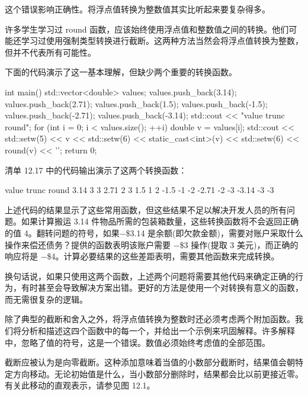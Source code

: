 这个错误影响正确性。将浮点值转换为整数值其实比听起来要复杂得多。


许多学生学习过 round 函数，应该始终使用浮点值和整数值之间的转换。他们可能还学习过使用强制类型转换进行截断。这两种方法当然会将浮点值转换为整数，但并不代表所有可能性。

下面的代码演示了这一基本理解，但缺少两个重要的转换函数。


\begin{cpp}
int main() {
  std::vector<double> values;
  values.push_back(3.14); values.push_back(2.71); values.push_back(1.5);
  values.push_back(-1.5); values.push_back(-2.71);
  values.push_back(-3.14);
  std::cout << "value trunc round\n";
  for (int i = 0; i < values.size(); ++i) {
    double v = values[i];
    std::cout << std::setw(5) << v
      << std::setw(6) << static_cast<int>(v)
      << std::setw(6) << round(v)
      << '\n';
  }
  return 0;
}
\end{cpp}

清单 12.17 中的代码输出演示了这两个转换函数：

\begin{shell}
value trunc round
 3.14     3     3
 2.71     2     3
  1.5     1     2
 -1.5    -1    -2
-2.71    -2    -3
-3.14    -3    -3
\end{shell}


上述代码的结果显示了这些常用函数，但这些结果不足以解决开发人员的所有问题。如果计算搬运 3.14 件物品所需的包装箱数量，这些转换函数将不会返回正确的值 4。翻转问题的符号，如果−\$3.14 是余额(即欠款金额)，需要对账户采取什么操作来偿还债务？提供的函数表明该账户需要 −\$3 操作(提取 3 美元)，而正确的响应将是 −\$4。计算必要结果的这些差距表明，需要其他函数来完成转换。

换句话说，如果只使用这两个函数，上述两个问题将需要其他代码来确定正确的行为，有时甚至会导致解决方案出错。更好的方法是使用一个对转换有意义的函数，而无需很复杂的逻辑。


除了典型的截断和舍入之外，将浮点值转换为整数时还必须考虑两个附加函数。我们将分析和描述这四个函数中的每一个，并给出一个示例来巩固解释。许多解释中，忽略了值的符号，这是一个错误。数值必须始终考虑值的全部范围。

截断应被认为是向零截断。这种添加意味着当值的小数部分截断时，结果值会朝特定方向移动。无论初始值是什么，当小数部分删除时，结果都会比以前更接近零。有关此移动的直观表示，请参见图 12.1。

